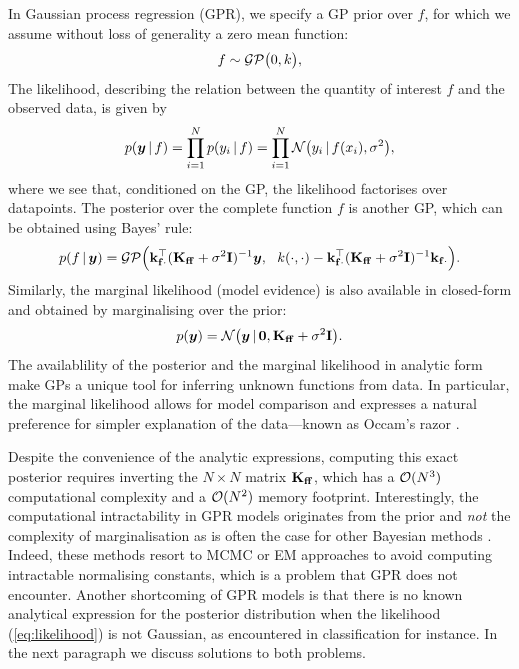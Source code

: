 In Gaussian process regression (GPR), we specify a GP prior over $f$, for which we assume without loss of generality a zero mean function:
\begin{equation}
  f \sim \mathcal{GP}\big(0, k\big),
\end{equation}
The likelihood, describing the relation between the quantity of interest $f$ and the observed data, is given by 
\begin{equation}
  \label{eq:likelihood}
  p(\vy \given f) = \prod_{i=1}^N p(y_i \given f) = \prod_{i=1}^N \NormDist{y_i \given f(x_i), \sigma^2},
\end{equation}
where we see that, conditioned on the GP, the likelihood factorises over datapoints. The posterior over the complete function $f$ is another GP, which can be obtained using Bayes' rule:
\begin{equation}
  \label{eq:f-given-y}
  p(f \,|\, \bm{y}) 
      = \mathcal{GP}\Big(\mathbf{k}_{\mathbf{f} \cdot}^\top (\mathbf{{K}}_{\mathbf{f} \mathbf{f}} + \sigma^2 \mathbf{{I}})^{-1} \bm{y},\ \ k(\cdot, \cdot) -  \mathbf{k}_{\mathbf{f} \cdot}^\top (\mathbf{{K}}_{\mathbf{f} \mathbf{f}} + \sigma^2 \mathbf{{I}})^{-1} \mathbf{k}_{\mathbf{f} \cdot}\Big).
\end{equation}
Similarly, the marginal likelihood (model evidence) is also available in closed-form and obtained by marginalising over the prior:
\begin{equation}
  \label{eq:log-marginal-likelihood}
  p(\vy) = \NormDist{\vy \given \vzero, \Kff + \sigma^2 \Eye}.
\end{equation}
The availablility of the posterior and the marginal likelihood in analytic form make GPs a unique tool for inferring unknown functions from data. In particular, the marginal likelihood allows for model comparison and expresses a natural preference for simpler explanation of the data---known as Occam's razor \citep{mackay2003information,Rasmussen2001Occam}.

Despite the convenience of the analytic expressions, computing this exact posterior requires inverting the $N \times N$ matrix $\Kff$, which has a $\mathcal{O}(N^3)$ computational complexity and a $\mathcal{O}(N^2)$ memory footprint. Interestingly, the computational intractability in GPR models originates from the prior and \emph{not} the complexity of marginalisation as is often the case for other Bayesian methods \citep[e.g.,][]{blei2003latent}. Indeed, these methods resort to MCMC or EM approaches to avoid computing intractable normalising constants, which is a problem that GPR does not encounter.  Another shortcoming of GPR models is that there is no known analytical expression for the posterior distribution when the likelihood (\cref{eq:likelihood}) is not Gaussian, as encountered in classification for instance. In the next paragraph we discuss solutions to both problems.

